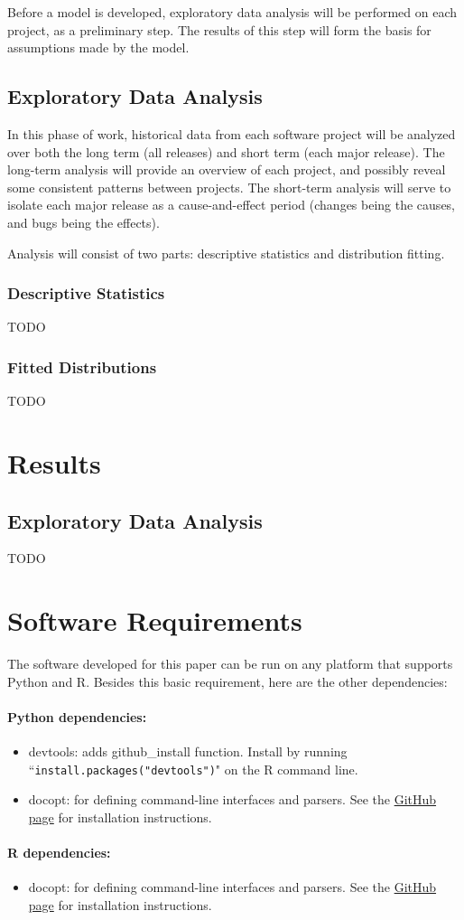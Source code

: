 \documentclass[a4paper]{scrartcl}
\begin{document}
Before a model is developed, exploratory data analysis will be performed on each project, as a preliminary step. The results of this step will form the basis for assumptions made by the model. 

\subsection{Exploratory Data Analysis}
In this phase of work, historical data from each software project will be analyzed over both the long term (all releases) and short term (each major release). The long-term analysis will provide an overview of each project, and possibly reveal some consistent patterns between projects. The short-term analysis will serve to isolate each major release as a cause-and-effect period (changes being the causes, and bugs being the effects).

Analysis will consist of two parts: descriptive statistics and distribution fitting.

\subsubsection{Descriptive Statistics}
TODO

\subsubsection{Fitted Distributions}
TODO

\section{Results}
\subsection{Exploratory Data Analysis}
TODO

\appendix
\section{Software Requirements}
The software developed for this paper can be run on any platform that supports Python and R. Besides this basic requirement, here are the other dependencies:
\paragraph{Python dependencies:}
\begin{itemize}
\item
devtools: adds github\_install function. Install by running ``\verb|install.packages("devtools")|" on the R command line.
\item
docopt: for defining command-line interfaces and parsers. See the \href{https://github.com/docopt/docopt}{GitHub page} for installation instructions.
\end{itemize}

\paragraph{R dependencies:}
\begin{itemize}
\item{docopt: for defining command-line interfaces and parsers. See the \href{https://github.com/edwindj/docopt.R}{GitHub page} for installation instructions.}
\end{itemize}




\end{document}
